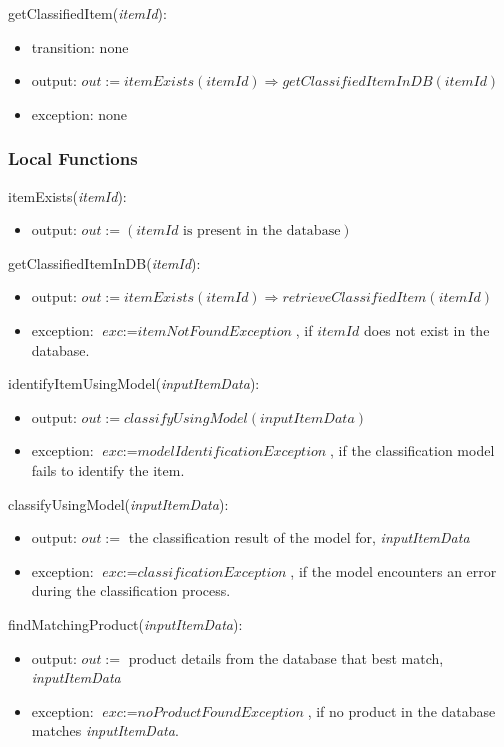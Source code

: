 \documentclass[12pt, titlepage]{article}
\begin{document}
\noindent getClassifiedItem(\textit{itemId}):
\begin{itemize}
  \item transition: none
  \item output: $out := \textit{itemExists}(\textit{itemId}) \Rightarrow \textit{getClassifiedItemInDB}(\textit{itemId})$
  \item exception: none
\end{itemize}

\subsubsection{Local Functions}

\noindent itemExists(\textit{itemId}):
\begin{itemize}
  \item output: $out := (\textit{itemId} \text{ is present in the database})$
\end{itemize}

\noindent getClassifiedItemInDB(\textit{itemId}):
\begin{itemize}
  \item output: $out := \textit{itemExists}(\textit{itemId}) \Rightarrow \textit{retrieveClassifiedItem}(\textit{itemId})$
  \item exception: $\textit{exc} := \textit{itemNotFoundException}$, if $\textit{itemId}$ does not exist in the database.
\end{itemize}

\noindent identifyItemUsingModel(\textit{inputItemData}):
\begin{itemize}
  \item output: $out := \textit{classifyUsingModel}(\textit{inputItemData})$
  \item exception: $\textit{exc} := \textit{modelIdentificationException}$, if the classification model fails to identify the item.
\end{itemize}

\noindent classifyUsingModel(\textit{inputItemData}):
\begin{itemize}
  \item output: $out :=$ the classification result of the model for, \textit{inputItemData}
  \item exception: $\textit{exc} := \textit{classificationException}$, if the model encounters an error during the classification process.
\end{itemize}

\noindent findMatchingProduct(\textit{inputItemData}):
\begin{itemize}
  \item output: $out :=$ product details from the database that best match, \textit{inputItemData}
  \item exception: $\textit{exc} := \textit{noProductFoundException}$, if no product in the database matches \textit{inputItemData}.
\end{itemize}
\end{document}

